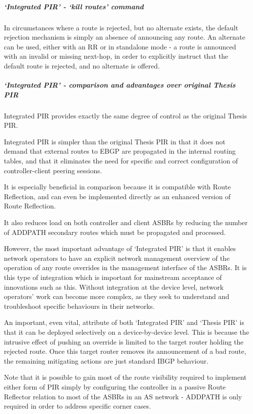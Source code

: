 \subparagraph{`Integrated PIR' - `kill routes' command}
In circumstances where a route is rejected, but no alternate exists, the default rejection mechanism is simply an absence of announcing any route.  An alternate can be used, either with an RR or in standalone mode - a route is announced with an invalid or missing next-hop, in order to explicitly instruct that the default route is rejected, and no alternate is offered.


\subparagraph{`Integrated PIR' - comparison and advantages over original Thesis PIR}

Integrated PIR provides exactly the same degree of control as the original Thesis PIR. 

Integrated PIR is simpler than the original Thesis PIR in that it does not demand that external routes to EBGP are propagated in the internal routing tables, and that it eliminates the need for specific and correct configuration of controller-client peering sessions.

It is especially beneficial in comparison because it is compatible with Route Reflection, and can even be implemented directly as an enhanced version of Route Reflection.

It also reduces load on both controller and client ASBRs by reducing the number of ADDPATH secondary routes which must be propagated and processed.

However, the most important advantage of `Integrated PIR' is that it enables network operators to have an explicit network management overview of the operation of any route overrides in the management interface of the ASBRs.  It is this type of integration which is important for mainstream acceptance of innovations such as this.  Without integration at the device level, network operators' work can become more complex, as they seek to understand and troubleshoot specific behaviours in their networks.

An important, even vital, attribute of both `Integrated PIR' and `Thesis PIR' is that it can be deployed selectively on a device-by-device level.  This is because the intrusive effect of pushing an override is limited to the target router holding the rejected route.  Once this target router removes its announcement of a bad route, the remaining mitigating actions are just standard IBGP behaviour.

Note that it is possible to gain most of the route visibility required to implement either form of PIR simply by configuring the controller in a passive Route Reflector relation to most of the ASBRs in an AS network -   ADDPATH is only required in order to address specific corner cases.

